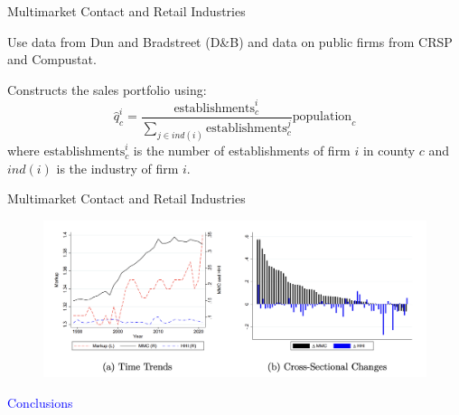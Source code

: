 \documentclass[notes,10.2pt, aspectratio=169]{beamer}
\newenvironment{wideitemize}{\itemize\addtolength{\itemsep}{10pt}}{\enditemize}
\begin{document}
\begin{frame}{Multimarket Contact and Retail Industries}

  \begin{wideitemize}
  \item Use data from Dun and Bradstreet (D\&B) and data on public firms from CRSP and Compustat.
  \item Constructs the sales portfolio using: 
  $$\hat{q}^i_c = \frac{\text{establishments}^i_c}{\sum_{j \in ind(i)} \text{establishments}^j_c}\text{population}_c$$
  where $\text{establishments}^i_c$ is the number of establishments of firm $i$ in county $c$ and $ind(i)$ is the industry of firm $i$.
\end{wideitemize}


\end{frame}


\begin{frame}{Multimarket Contact and Retail Industries}

  \begin{figure}[t*]
    \centering
    \includegraphics[width=.9\textwidth]{./imgs/figure4.png}
  \end{figure}
  
\end{frame}

      \begin{frame}[noframenumbering]
        \textcolor{blue}{\huge{\centerline{Conclusions}}}
    \end{frame}
    
\end{document}
